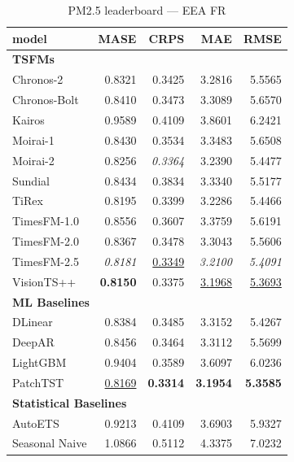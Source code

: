 \begin{table}[H]
\caption{PM2.5 leaderboard --- EEA FR}
\centering
\begin{small}
\begin{tabular}{lrrrr}
\toprule
model & MASE & CRPS & MAE & RMSE \\
\midrule
\multicolumn{5}{l}{\textbf{TSFMs}} \\
Chronos-2 & 0.8321 & 0.3425 & 3.2816 & 5.5565 \\
Chronos-Bolt & 0.8410 & 0.3473 & 3.3089 & 5.6570 \\
Kairos & 0.9589 & 0.4109 & 3.8601 & 6.2421 \\
Moirai-1 & 0.8430 & 0.3534 & 3.3483 & 5.6508 \\
Moirai-2 & 0.8256 & \textit{0.3364} & 3.2390 & 5.4477 \\
Sundial & 0.8434 & 0.3834 & 3.3340 & 5.5177 \\
TiRex & 0.8195 & 0.3399 & 3.2286 & 5.4466 \\
TimesFM-1.0 & 0.8556 & 0.3607 & 3.3759 & 5.6191 \\
TimesFM-2.0 & 0.8367 & 0.3478 & 3.3043 & 5.5606 \\
TimesFM-2.5 & \textit{0.8181} & \underline{0.3349} & \textit{3.2100} & \textit{5.4091} \\
VisionTS++ & \textbf{0.8150} & 0.3375 & \underline{3.1968} & \underline{5.3693} \\
\midrule
\multicolumn{5}{l}{\textbf{ML Baselines}} \\
DLinear & 0.8384 & 0.3485 & 3.3152 & 5.4267 \\
DeepAR & 0.8456 & 0.3464 & 3.3112 & 5.5699 \\
LightGBM & 0.9404 & 0.3589 & 3.6097 & 6.0236 \\
PatchTST & \underline{0.8169} & \textbf{0.3314} & \textbf{3.1954} & \textbf{5.3585} \\
\midrule
\multicolumn{5}{l}{\textbf{Statistical Baselines}} \\
AutoETS & 0.9213 & 0.4109 & 3.6903 & 5.9327 \\
Seasonal Naive & 1.0866 & 0.5112 & 4.3375 & 7.0232 \\
\bottomrule
\end{tabular}
\end{small}
\end{table}